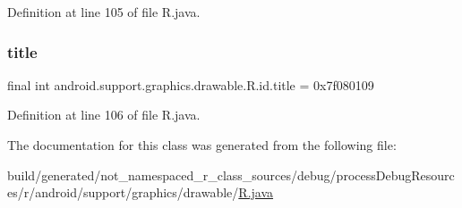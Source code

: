 Definition at line 105 of file R.\+java.

\mbox{\label{classandroid_1_1support_1_1graphics_1_1drawable_1_1_r_1_1id_ae4c46d15d4cdd1b6504115837b34d591}} 
\subsubsection{\texorpdfstring{title}{title}}
{\footnotesize\ttfamily final int android.\+support.\+graphics.\+drawable.\+R.\+id.\+title = 0x7f080109\hspace{0.3cm}{\ttfamily [static]}}



Definition at line 106 of file R.\+java.



The documentation for this class was generated from the following file\+:\begin{DoxyCompactItemize}
\item 
build/generated/not\+\_\+namespaced\+\_\+r\+\_\+class\+\_\+sources/debug/process\+Debug\+Resources/r/android/support/graphics/drawable/\mbox{\hyperlink{android_2support_2graphics_2drawable_2_r_8java}{R.\+java}}\end{DoxyCompactItemize}
